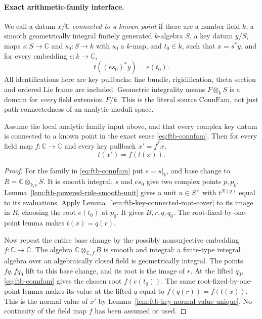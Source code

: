 \paragraph{Exact arithmetic-family interface.}
We call a datum \(x/\mathbb C\) \emph{connected to a known point}
if there are a number field \(k\), a smooth geometrically
integral finitely generated \(k\)-algebra \(S\), a key datum
\(y/S\), maps \(s:S\to\mathbb C\) and \(s_0:S\to k\) with
\(s_0\) a \(k\)-map, and \(t_0\in k\), such that
\(x=s^*y\), and for every embedding \(e:k\to\mathbb C\),
\[
                         t((e s_0)^*y)=e(t_0).
 \tag{R5}\label{eq:ftb-connfam}
\]
All identifications here are key pullbacks: line bundle,
rigidification, theta section and ordered Lie frame are included.
Geometric integrality means \(F\otimes_k S\) is a domain for
\emph{every} field extension \(F/k\).
This is the literal source \(\mathrm{ConnFam}\), not just
path connectedness of an analytic moduli space.

\begin{srproposition}
\label{prop:ftb-key-complex-equivariance}
Assume the local analytic family input above, and that every
complex key datum is connected to a known point in the exact
sense \eqref{eq:ftb-connfam}.
Then for every field map \(f:\mathbb C\to\mathbb C\) and every
key pullback \(x'=f^*x\),
\[
                              t(x')=f(t(x)).
 \tag{R6}\label{eq:ftb-key-complex-funct}
\]
\end{srproposition}
\begin{proof}
For the family in \eqref{eq:ftb-connfam} put
\(e=s|_k\), and base change to
\(R=\mathbb C\otimes_{k,e}S\).
It is smooth integral; \(s\) and \(es_0\) give two complex
points \(p,p_0\).
Lemma~\ref{lem:ftb-powered-rule-smooth-unit} gives a unit
\(u\in S^\times\) with \(t^{N(g)}\) equal to its evaluations.
Apply Lemma~\ref{lem:ftb-key-connected-root-cover} to its
image in \(R\), choosing the root \(e(t_0)\) at \(p_0\).
It gives \(B,r,q,q_0\).
The root-fixed-by-one-point lemma makes \(t(x)=q(r)\).

Now repeat the entire base change by the possibly nonsurjective
embedding \(f:\mathbb C\to\mathbb C\).
The algebra \(\mathbb C\otimes_{\mathbb C,f}B\) is smooth and
integral: a finite-type integral algebra over an algebraically
closed field is geometrically integral.
The points \(fq,fq_0\) lift to this base change, and its root
is the image of \(r\).
At the lifted \(q_0\), \eqref{eq:ftb-connfam} gives the chosen
root \(f(e(t_0))\).
The same root-fixed-by-one-point lemma makes its value at the
lifted \(q\) equal to \(f(q(r))=f(t(x))\).
This is the normal value of \(x'\) by
Lemma~\ref{lem:ftb-key-normal-value-unique}.
No continuity of the field map \(f\) has been assumed or used.
\end{proof}

